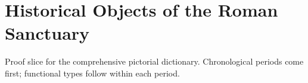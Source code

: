 


\section*{Historical Objects of the Roman Sanctuary}
\noindent\small
Proof slice for the comprehensive pictorial dictionary. Chronological periods
come first; functional types follow within each period.


